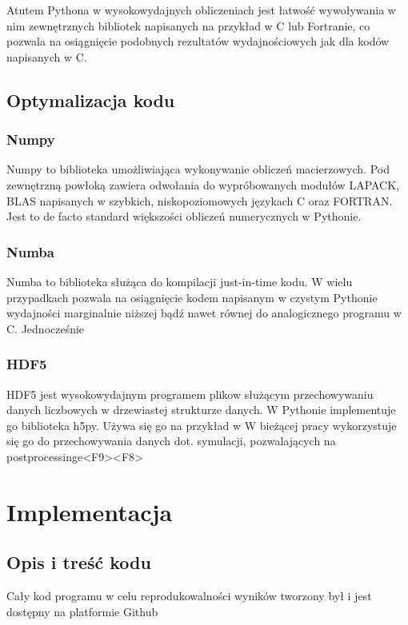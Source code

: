 Atutem Pythona w wysokowydajnych obliczeniach jest łatwość wywoływania w nim zewnętrznych bibliotek napisanych
na przykład w C lub Fortranie, co pozwala na osiągnięcie podobnych rezultatów wydajnościowych jak dla kodów
napisanych w C.

\subsection{Optymalizacja kodu}

\subsubsection{Numpy}
Numpy to biblioteka umożliwiająca wykonywanie obliczeń macierzowych. Pod zewnętrzną powłoką zawiera odwołania do
wypróbowanych modułów LAPACK, BLAS %
napisanych w szybkich, niskopoziomowych językach C oraz FORTRAN. Jest to de facto standard większości obliczeń
numerycznych w Pythonie.
\subsubsection{Numba}
Numba to biblioteka służąca do kompilacji just-in-time kodu. %
W wielu przypadkach %
pozwala na osiągnięcie kodem napisanym w czystym Pythonie wydajności marginalnie niższej bądź nawet równej do analogicznego
programu w C. %
Jednocześnie 
\subsubsection{HDF5}
HDF5 jest wysokowydajnym programem plikow służącym przechowywaniu danych liczbowych w drzewiastej strukturze danych.
W Pythonie implementuje go biblioteka h5py.
Używa się go na przykład w %
W bieżącej pracy  wykorzystuje się go do przechowywania danych dot. symulacji, pozwalających na postprocessinge<F9><F8>

\section[Implementacja]{Implementacja}%
\subsection{Opis i treść kodu}
Cały kod programu w celu reprodukowalności wyników tworzony był i jest dostępny na platformie Github %

